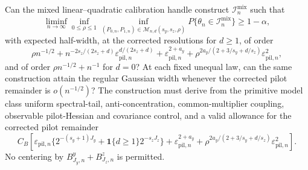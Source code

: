 Can the mixed linear--quadratic calibration handle construct \(\mathcal I_n^{\mathrm{mix}}\) such that
\[
\liminf_{n\to\infty}\inf_{0\le\rho\le1}\inf_{(P_{0,n},P_{1,n})\in\mathcal M_{n,d}(s_y,s_z,\rho)}P\{\theta_n\in\mathcal I_n^{\mathrm{mix}}\}\ge1-\alpha,
\]
with expected half-width, at the corrected resolutions for \(d\ge1\), of order
\[
\rho n^{-1/2}
+n^{-2s_z/(2s_z+d)}\varepsilon_{\mathrm{pil},n}^{d/(2s_z+d)}
+\varepsilon_{\mathrm{pil},n}^{2+a_y}
+\rho^{2a_y/(2+3/s_y+d/s_z)}\varepsilon_{\mathrm{pil},n}^2,
\]
and of order \(\rho n^{-1/2}+n^{-1}\) for \(d=0\)?  At each fixed unequal law, can the same construction attain the regular Gaussian width whenever the corrected pilot remainder is \(o(n^{-1/2})\)? The construction must derive from the primitive model class uniform spectral-tail, anti-concentration, common-multiplier coupling, observable pilot-Hessian and covariance control, and a valid allowance for the corrected pilot remainder
\[
C_B\left[
\varepsilon_{\mathrm{pil},n}\{2^{-(s_y+1)J_y}+\mathbf 1\{d\ge1\}2^{-s_zJ_z}\}
+\varepsilon_{\mathrm{pil},n}^{2+a_y}
+\rho^{2a_y/(2+3/s_y+d/s_z)}\varepsilon_{\mathrm{pil},n}^2
\right].
\]
No centering by \(B^y_{J_y,n}+B^z_{J_z,n}\) is permitted.